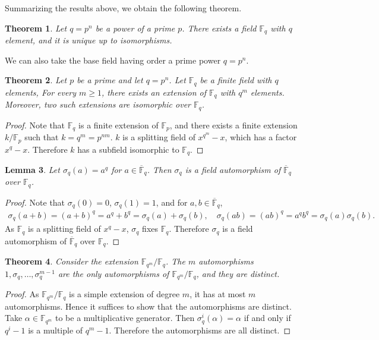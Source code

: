 \documentclass[12pt]{report}
\theoremstyle{plain}
\newtheorem{theorem}{Theorem}[section]
\newtheorem{lemma}[theorem]{Lemma}
\theoremstyle{remark}
\theoremstyle{definition}
\begin{document}
Summarizing the results above, we obtain the following theorem.

\begin{theorem}
    Let $q=p^n$ be a power of a prime $p$. There exists a field $\mathbb{F}_q$ with $q$ element, and it is unique up to isomorphisms.
\end{theorem}

We can also take the base field having order a prime power $q=p^n$.

\begin{theorem}
    Let $p$ be a prime and let $q=p^n$. Let $\mathbb{F}_q$ be a finite field with $q$ elements, For every $m\ge 1$, there exists an extension of $\mathbb{F}_q$ with $q^m$ elements. Moreover, two such extensions are isomorphic over $\mathbb{F}_q$. 
\end{theorem}
\begin{proof}
    Note that $\mathbb{F}_q$ is a finite extension of $\mathbb{F}_p$, and there exists a finite extension $k/\mathbb{F}_p$ such that $k = q^m = p^{nm}$. $k$ is a splitting field of $x^{q^m}-x$, which has a factor $x^q-x$. Therefore $k$ has a subfield isomorphic to $\mathbb{F}_q$.
\end{proof}

\begin{lemma}
    Let $\sigma_q(a) = a^q$ for $a\in\overline{\mathbb{F}}_q$. Then $\sigma_q$ is a field automorphism of $\overline{\mathbb{F}}_q$ over $\mathbb{F}_q$.
\end{lemma}
\begin{proof}
    Note that $\sigma_q(0)=0$, $\sigma_q(1) = 1$, and for $a,b\in\overline{\mathbb{F}}_q$,
    \begin{align*}
        \sigma_q(a+b) = (a+b)^q = a^q+b^q = \sigma_q(a) + \sigma_q(b),\quad \sigma_q(ab) = (ab)^q = a^qb^q = \sigma_q(a)\sigma_q(b).
    \end{align*}
    As $\mathbb{F}_q$ is a splitting field of $x^q-x$, $\sigma_q$ fixes $\mathbb{F}_q$. Therefore $\sigma_q$ is a field automorphism of $\overline{\mathbb{F}}_q$ over $\mathbb{F}_q$.
\end{proof}

\begin{theorem}
    Consider the extension $\mathbb{F}_{q^m}/\mathbb{F}_q$. The $m$ automorphisms $1,\sigma_q,\dots,\sigma_{q}^{m-1}$ are the only automorphisms of $\mathbb{F}_{q^m}/\mathbb{F}_q$, and they are distinct.
\end{theorem}
\begin{proof}
    As $\mathbb{F}_{q^m}/\mathbb{F}_q$ is a simple extension of degree $m$, it has at most $m$ automorphisms. Hence it suffices to show that the automorphisms are distinct. Take $\alpha\in\mathbb{F}_{q^m}$ to be a multiplicative generator. Then $\sigma_q^i(\alpha)=\alpha$ if and only if $q^{i}-1$ is a multiple of $q^m-1$. Therefore the automorphisms are all distinct.
\end{proof}
\end{document}
